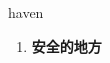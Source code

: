 
\begin{frame}
{\huge haven}
\begin{center}
\begin{enumerate}\Large
  \item \textbf{安全的地方}
\end{enumerate}
\end{center}
\end{frame}
